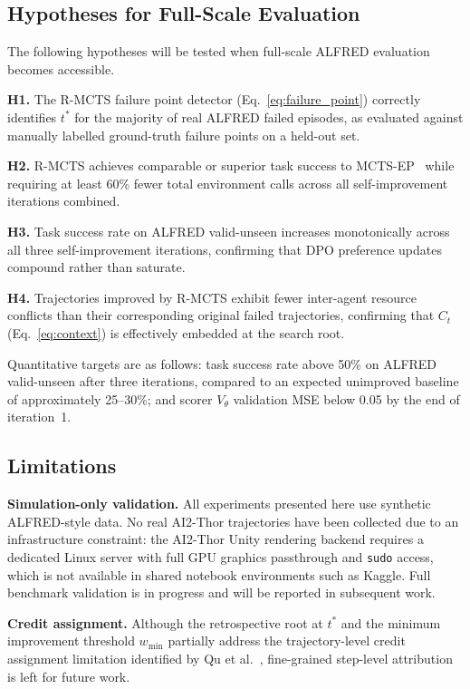 \documentclass[pdflatex,sn-mathphys-num]{sn-jnl}
\theoremstyle{thmstyleone}
\theoremstyle{thmstyletwo}
\theoremstyle{thmstylethree}
\newcommand{\RMCTS}{\textsc{R-MCTS}}
\newcommand{\Vtheta}{V_{\!\theta}}
\newcommand{\Ct}{C_{t}}
\begin{document}
\subsection{Hypotheses for Full-Scale Evaluation}\label{sec:hypotheses}

The following hypotheses will be tested when full-scale ALFRED
evaluation becomes accessible.

\textbf{H1.}
The \RMCTS{} failure point detector (Eq.~\ref{eq:failure_point})
correctly identifies $t^*$ for the majority of real ALFRED failed
episodes, as evaluated against manually labelled ground-truth failure
points on a held-out set.

\textbf{H2.}
\RMCTS{} achieves comparable or superior task success to
MCTS-EP~\cite{xu2025mcts} while requiring at least 60\% fewer total
environment calls across all self-improvement iterations combined.

\textbf{H3.}
Task success rate on ALFRED valid-unseen increases monotonically across
all three self-improvement iterations, confirming that DPO preference
updates compound rather than saturate.

\textbf{H4.}
Trajectories improved by \RMCTS{} exhibit fewer inter-agent resource
conflicts than their corresponding original failed trajectories,
confirming that $\Ct$ (Eq.~\ref{eq:context}) is effectively embedded
at the search root.

Quantitative targets are as follows: task success rate above 50\% on
ALFRED valid-unseen after three iterations, compared to an expected
unimproved baseline of approximately 25--30\%; and scorer $\Vtheta$
validation MSE below 0.05 by the end of iteration~1.

\subsection{Limitations}

\textbf{Simulation-only validation.}
All experiments presented here use synthetic ALFRED-style data.
No real AI2-Thor trajectories have been collected due to an
infrastructure constraint: the AI2-Thor Unity rendering backend requires
a dedicated Linux server with full GPU graphics passthrough and
\texttt{sudo} access, which is not available in shared notebook
environments such as Kaggle.
Full benchmark validation is in progress and will be reported in
subsequent work.

\textbf{Credit assignment.}
Although the retrospective root at $t^*$ and the minimum improvement
threshold $w_{\min}$ partially address the trajectory-level credit
assignment limitation identified by Qu et al.~\cite{qu2025oreo},
fine-grained step-level attribution is left for future work.
\end{document}
